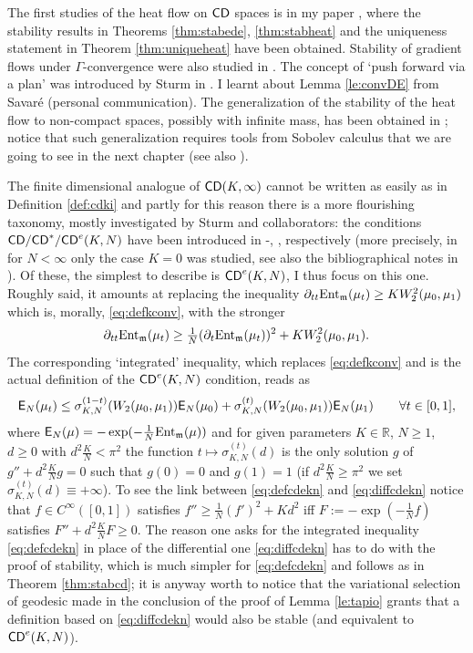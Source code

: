 \documentclass[11pt]{article}
\numberwithin{equation}{section}
\newcommand{\R}{\mathbb{R}}
\newcommand{\mm}{{\mathfrak m}}
\newcommand{\CD}{{\sf CD}}
\newcommand{\ent}{{\rm Ent}_\mm}
\newcommand{\E}{{\sf E}} %
\begin{document}
{{The first studies of the heat flow on $\CD$ spaces is in my paper \cite{Gigli10}, where the stability results  in Theorems \ref{thm:stabede}, \ref{thm:stabheat} and the uniqueness statement in Theorem \ref{thm:uniqueheat} have been obtained. Stability of gradient flows under $\Gamma$-convergence were also studied in \cite{SandSerf}. The concept of `push forward via a plan' was introduced by Sturm in \cite{Sturm06I}. I learnt about Lemma \ref{le:convDE} from  Savar\'e (personal communication). The generalization of the stability of the heat flow to non-compact spaces, possibly with infinite mass, has been obtained in \cite{GMS15}; notice that such generalization requires tools from Sobolev calculus that we are going to see in the next chapter (see also \cite[Remark 5.13]{GMS15}).


\medskip

The finite dimensional analogue  of  $\CD(K,\infty)$ cannot be written as easily as in Definition \ref{def:cdki} and partly for this reason there is a more flourishing taxonomy, mostly investigated by Sturm and collaborators: the conditions $\CD/\CD^*/\CD^e(K,N)$ have been introduced in \cite{Lott-Villani09}-\cite{Sturm06II}, \cite{BacherSturm10}, \cite{Erbar-Kuwada-Sturm13}  respectively  (more precisely, in \cite{Lott-Villani09} for $N<\infty$ only the case $K=0$ was studied, see also the bibliographical notes in \cite{Villani09}). Of these, the simplest to describe is $\CD^e(K,N)$,  I thus focus on this one. Roughly said, it amounts at replacing the inequality $\partial_{tt}\ent(\mu_t)\geq KW_2^2(\mu_0,\mu_1)$ which is, morally, \eqref{eq:defkconv}, with the stronger 
\begin{equation}
\label{eq:diffcdekn}
\partial_{tt}\ent(\mu_t)\geq \tfrac1N(\partial_t\ent(\mu_t))^2+KW_2^2(\mu_0,\mu_1).
\end{equation}
 The corresponding `integrated' inequality, which replaces \eqref{eq:defkconv} and is the actual definition of the $\CD^e(K,N)$ condition, reads as
\begin{equation}
\label{eq:defcdekn}
\E_N(\mu_t)\leq \sigma^{(1-t)}_{K,N}(W_2(\mu_0,\mu_1))\E_N(\mu_0)+\sigma^{(t)}_{K,N}(W_2(\mu_0,\mu_1))\E_N(\mu_1)\qquad\forall t\in[0,1],
\end{equation}
where $\E_N(\mu)=-\exp(-\tfrac1N\ent(\mu))$ and for given parameters $K\in\R$, $N\geq1$, $d\geq 0$ with $d^2 \tfrac KN<\pi^2$ the function $t\mapsto \sigma^{(t)}_{K,N}(d)$ is the only solution $g$ of $g''+d^2\tfrac KNg=0$ such that $g(0)=0$ and $g(1)=1$ (if $d^2 \tfrac KN\geq\pi^2$ we set $ \sigma^{(t)}_{K,N}(d)\equiv+\infty$).  To see the link between \eqref{eq:defcdekn} and \eqref{eq:diffcdekn}  notice that $f\in C^\infty([0,1])$ satisfies $f''\geq\tfrac1N(f')^2+Kd^2$ iff $F:=-\exp(-\tfrac1Nf)$ satisfies $F''+d^2\tfrac KNF\geq0$. The reason one asks for the integrated inequality \eqref{eq:defcdekn} in place of the differential one \eqref{eq:diffcdekn} has to do with the proof of stability, which is much simpler for  \eqref{eq:defcdekn} and follows as in Theorem \ref{thm:stabcd}; it is anyway worth to notice that the variational selection of geodesic made in the conclusion of the proof of Lemma \ref{le:tapio} grants that a definition based on \eqref{eq:diffcdekn} would also be stable (and equivalent to $\CD^e(K,N)$).


}}
\end{document}
